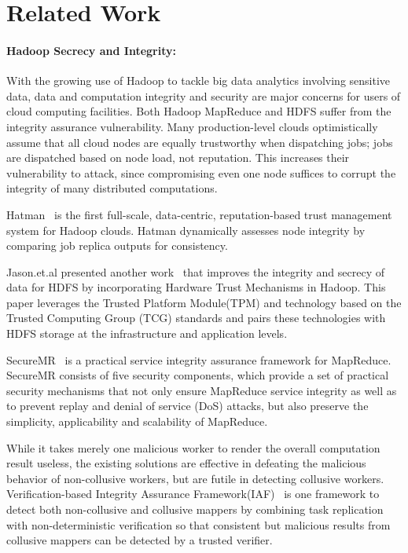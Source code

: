 \section{Related Work}
\label{sec:relwork}
\iffalse
Related Work (``somewhat related'' work goes here; directly related work
goes into the Introduction)~\cite{dsd13}.
\fi
\paragraph{Hadoop Secrecy and Integrity:} With the growing use of Hadoop to tackle big data analytics involving sensitive data, data and computation integrity and security are major concerns for users of cloud computing facilities. Both Hadoop MapReduce and HDFS suffer from the integrity assurance vulnerability. Many production-level clouds optimistically assume that all cloud nodes are equally trustworthy when dispatching jobs; jobs are dispatched based on node load, not reputation. This increases their vulnerability to attack, since compromising even one node suffices to corrupt the integrity of many distributed computations. 

Hatman~\cite{khan2012hatman} is the first full-scale, data-centric, reputation-based trust management system for Hadoop clouds. Hatman dynamically assesses node integrity by comparing job replica outputs for consistency. 

Jason.et.al presented another work~\cite{cohen2012incorporating} that improves the integrity and secrecy of data for HDFS by incorporating Hardware Trust Mechanisms in Hadoop. This paper leverages the Trusted Platform Module(TPM) and technology based on the Trusted Computing Group (TCG) standards and pairs these technologies with HDFS storage at the infrastructure and application levels. 

SecureMR~\cite{wei2009securemr} is a practical service integrity assurance framework for MapReduce. SecureMR consists of five security components, which provide a set of practical security mechanisms that not only ensure MapReduce service integrity as well as to prevent replay and denial of service (DoS) attacks, but also preserve the simplicity, applicability and scalability of MapReduce.

While it takes merely one malicious worker to render the overall computation result useless, the existing solutions are effective in defeating the malicious behavior of non-collusive workers, but are futile in detecting collusive workers. Verification-based Integrity Assurance Framework(IAF)~\cite{wang2011viaf} is one framework to detect both non-collusive and collusive mappers by combining task replication with non-deterministic verification so that consistent but malicious results from collusive mappers can be detected by a trusted verifier.

